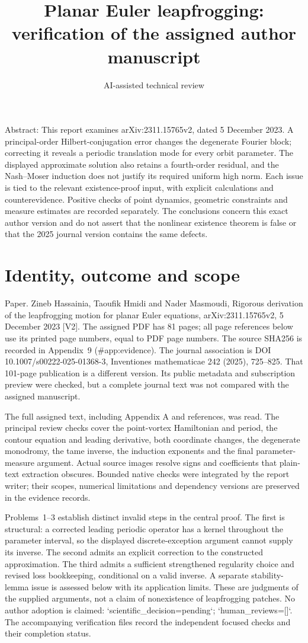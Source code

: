 \documentclass[10pt]{article}
\title{Planar Euler leapfrogging:
verification of the assigned author manuscript}
\author{AI-assisted technical review}
\date{}
\begin{document}
\maketitle
Abstract: This report examines arXiv:2311.15765v2, dated 5 December 2023. A principal-order Hilbert-conjugation error changes the degenerate Fourier block; correcting it reveals a periodic translation mode for every orbit parameter. The displayed approximate solution also retains a fourth-order residual, and the Nash–Moser induction does not justify its required uniform high norm. Each issue is tied to the relevant existence-proof input, with explicit calculations and counterevidence. Positive checks of point dynamics, geometric constraints and measure estimates are recorded separately. The conclusions concern this exact author version and do not assert that the nonlinear existence theorem is false or that the 2025 journal version contains the same defects.\par
\section*{Identity, outcome and scope}
Paper. Zineb Hassainia, Taoufik Hmidi and Nader Masmoudi, Rigorous derivation of the leapfrogging motion for planar Euler equations, arXiv:2311.15765v2, 5 December 2023 [V2]. The assigned PDF has 81 pages; all page references below use its printed page numbers, equal to PDF page numbers. The source SHA256 is recorded in Appendix 9 (\#app:evidence). The journal association is DOI 10.1007/s00222-025-01368-3, Inventiones mathematicae 242 (2025), 725–825. That 101-page publication is a different version. Its public metadata and subscription preview were checked, but a complete journal text was not compared with the assigned manuscript.\par
The full assigned text, including Appendix A and references, was read. The principal review checks cover the point-vortex Hamiltonian and period, the contour equation and leading derivative, both coordinate changes, the degenerate monodromy, the tame inverse, the induction exponents and the final parameter-measure argument. Actual source images resolve signs and coefficients that plain-text extraction obscures. Bounded native checks were integrated by the report writer; their scopes, numerical limitations and dependency versions are preserved in the evidence records.\par
Problems 1–3 establish distinct invalid steps in the central proof. The first is structural: a corrected leading periodic operator has a kernel throughout the parameter interval, so the displayed discrete-exception argument cannot supply its inverse. The second admits an explicit correction to the constructed approximation. The third admits a sufficient strengthened regularity choice and revised loss bookkeeping, conditional on a valid inverse. A separate stability-lemma issue is assessed below with its application limits. These are judgments of the supplied arguments, not a claim of nonexistence of leapfrogging patches. No author adoption is claimed: `scientific\_decision=pending`; `human\_reviews=[]`. The accompanying verification files record the independent focused checks and their completion status.\par
\end{document}
